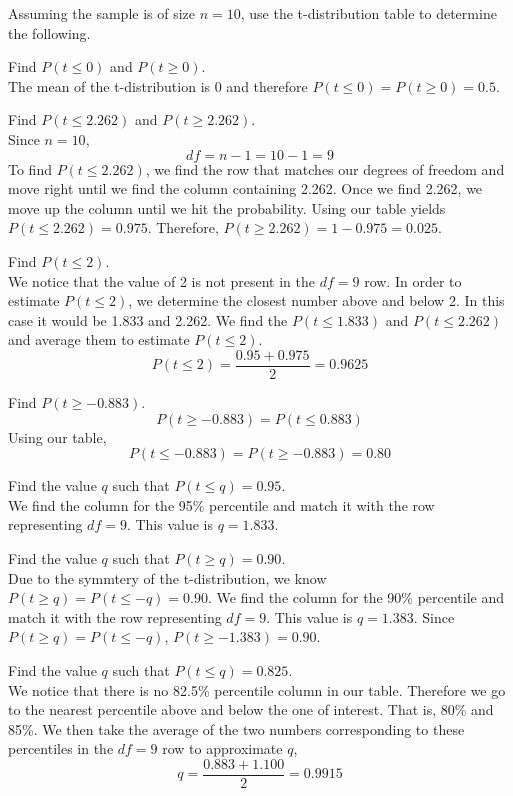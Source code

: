 \begin{example}
Assuming the sample is of size $n=10$, use the t-distribution table to determine the following.

\begin{benumerate}
\item Find $P(t \leq 0)$ and $P(t \geq 0)$.\\
The mean of the t-distribution is 0 and therefore $P(t \leq 0) = P(t \geq 0) = 0.5$.

\item Find $P(t \leq 2.262)$ and $P(t \geq 2.262)$. \\
Since $n=10$,
\[ df = n-1 = 10 -1 =9\]
To find $P(t \leq 2.262)$, we find the row that matches our degrees of freedom and move right until we find the column containing 2.262. Once we find 2.262, we move up the column until we hit the probability. Using our table yields $P(t \leq 2.262) = 0.975$. Therefore, $P(t \geq 2.262) = 1 - 0.975= 0.025$.

\item Find $P(t \leq 2)$. \\
We notice that the value of 2 is not present in the $df=9$ row. In order to estimate $P(t \leq 2)$, we determine the closest number above and below 2. In this case it would be 1.833 and 2.262. We find the $P(t \leq 1.833)$ and $P(t \leq 2.262)$ and average them to estimate $P(t \leq 2)$. 
\[ P(t \leq 2) = \frac{0.95+0.975}{2} = 0.9625 \]

\item Find $P( t \geq -0.883)$.
\[P( t \geq -0.883) = P(t \leq 0.883)\]
Using our table,
\[P( t \leq -0.883) = P( t \geq -0.883)=0.80 \]

\item Find the value $q$ such that $P(t \leq q) = 0.95$.\\
We find the column for the 95\% percentile and match it with the row representing $df=9$. This value is $q=1.833$.

\item Find the value $q$ such that $P(t \geq q) = 0.90$.\\
Due to the symmtery of the t-distribution, we know $P(t \geq q) = P(t \leq -q) = 0.90$.  We find the column for the 90\% percentile and match it with the row representing $df=9$. This value is $q=1.383$. Since $P(t \geq q) = P(t \leq -q)$, $P(t \geq -1.383) = 0.90$.

\item Find the value $q$ such that $P(t \leq q) = 0.825$.\\
We notice that there is no 82.5\% percentile column in our table. Therefore we go to the nearest percentile above and below the one of interest. That is, 80\% and 85\%. We then take the average of the two numbers corresponding to these percentiles in the $df=9$ row to approximate $q$,
\[q = \frac{0.883+1.100}{2}=0.9915\]
\end{benumerate}
\end{example}





